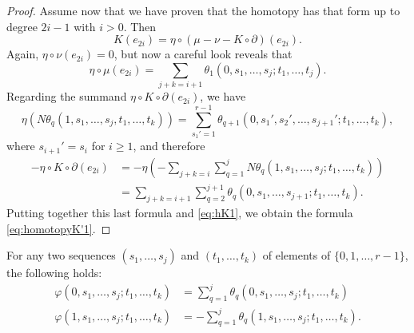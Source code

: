\begin{proof}
	Assume now that we have proven that the homotopy has that form up to degree $2i-1$ with $i>0$.
	Then
	\[K(e_{2i}) = \eta\circ (\mu-\nu-K\circ\partial)(e_{2i}).\]
	Again, $\eta\circ\nu(e_{2i}) = 0$, but now a careful look reveals that
	\begin{equation}\label{eq:hK1}\eta\circ\mu(e_{2i}) = \sum_{j+k=i+1}\theta_1(0,s_1,\ldots,s_j;t_1,\ldots,t_j).
	\end{equation}
	Regarding the summand $\eta\circ K\circ \partial(e_{2i})$, we have
	\[\eta(N\theta_q(1,s_1,\ldots,s_j,t_1,\ldots,t_k)) = \sum_{s_1' = 1}^{r-1}\theta_{q+1}(0,s_1',s_2',\ldots,s_{j+1}';t_1,\ldots,t_k),\]
	where $s_{i+1}' = s_i$ for $i\geq 1$, and therefore
	\begin{align*} \label{eq:hK2}
		-\eta\circ K\circ\partial(e_{2i})
		&= -\eta\left(-\sum_{j+k = i}\sum_{q=1}^j N\theta_q(1,s_1,\ldots,s_j;t_1,\ldots,t_k)\right) \\
		&= \sum_{j+k = i+1}\sum_{q=2}^{j+1}\theta_q(0,s_1,\ldots,s_{j+1};t_1,\ldots,t_k).
	\end{align*}
	Putting together this last formula and \eqref{eq:hK1}, we obtain the formula \eqref{eq:homotopyK'1}.
\end{proof}

\begin{lemma}\label{l:homotopyK''}
	For any two sequences $(s_1,\ldots,s_j)$ and $(t_1,\ldots,t_k)$ of elements of $\{0,1,\ldots,r-1\}$, the following holds:
	\begin{align*}
		\varphi(0,s_1,\ldots,s_j;t_1,\ldots,t_k) &= \sum_{q=1}^j \theta_q(0,s_1,\ldots,s_j;t_1,\ldots,t_k) \\
		\varphi(1,s_1,\ldots,s_j;t_1,\ldots,t_k) &= -\sum_{q=1}^j \theta_q(1,s_1,\ldots,s_j;t_1,\ldots,t_k).
	\end{align*}
\end{lemma}

